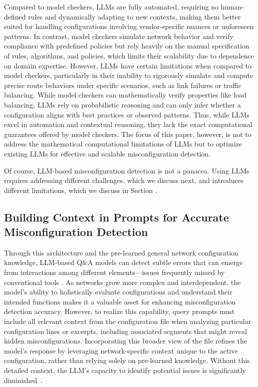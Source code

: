 Compared to model checkers, LLMs are fully automated, requiring no human-defined rules and dynamically adapting to new contexts, making them better suited for handling configurations involving vendor-specific nuances or unforeseen patterns. In contrast, model checkers simulate network behavior and verify compliance with predefined policies but rely heavily on the manual specification of rules, algorithms, and policies, which limits their scalability due to dependence on domain expertise. However, LLMs have certain limitations when compared to model checkers, particularly in their inability to rigorously simulate and compute precise route behaviors under specific scenarios, such as link failures or traffic balancing. While model checkers can mathematically verify properties like load balancing, LLMs rely on probabilistic reasoning and can only infer whether a configuration aligns with best practices or observed patterns. Thus, while LLMs excel in automation and contextual reasoning, they lack the exact computational guarantees offered by model checkers. The focus of this paper, however, is not to address the mathematical computational limitations of LLMs but to optimize existing LLMs for effective and scalable misconfiguration detection.

Of course, LLM-based misconfiguration detection is not a panacea. Using LLMs requires addressing different challenges, which we discuss next, and introduces different limitations, which we discuss in Section .

\subsection{Building Context in Prompts for Accurate Misconfiguration Detection}
\label{sec:background:context}

Through this architecture and the pre-learned general network configuration
knowledge, LLM-based Q\&A models can detect subtle errors that can emerge from
interactions among different elements—issues frequently missed by conventional
tools . As networks grow more complex and interdependent, the model’s ability to
holistically evaluate configurations and understand their intended functions
makes it a valuable asset for enhancing misconfiguration detection accuracy.
However, to realize this capability, query prompts must include all relevant
context from the configuration file when analyzing particular configuration lines
or excerpts, including associated segments that might reveal hidden
misconfigurations. Incorporating this broader view of the file refines the
model’s response by leveraging network-specific context unique to the active
configuration, rather than relying solely on pre-learned knowledge. Without
this detailed context, the LLM’s capacity to identify potential issues is
significantly diminished~\cite{liskavets2024prompt,tian2024examining,khurana2024and,
	shvartzshnaider2024llm}.

